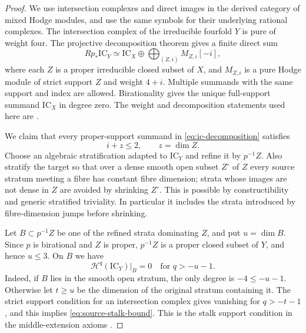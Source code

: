 \begin{proof}
We use intersection complexes and direct images in the derived
category of mixed Hodge modules, and use the same symbols for their
underlying rational complexes.  The intersection complex of the
irreducible fourfold $Y$ is pure of weight four.  The projective
decomposition theorem gives a finite direct sum
\begin{equation}\label{eq:ic-decomposition}
 Rp_*\mathrm{IC}_Y\simeq
 \mathrm{IC}_X\oplus\bigoplus_{(Z,i)}M_{Z,i}[-i],
\end{equation}
where each $Z$ is a proper irreducible closed subset of $X$, and
$M_{Z,i}$ is a pure Hodge module of strict support $Z$ and weight
$4+i$.  Multiple summands with the same support and index are
allowed.  Birationality gives the unique full-support summand
$\mathrm{IC}_X$ in degree zero.  The weight and decomposition
statements used here are \cite[\S\S1.6--1.8, 1.12--1.13]{Saito1989}.

We claim that every proper-support summand in
\eqref{eq:ic-decomposition} satisfies
\begin{equation}\label{eq:proper-support-bound}
 i+z\leq 2,\qquad z=\dim Z.
\end{equation}
Choose an algebraic stratification adapted to $\mathrm{IC}_Y$ and
refine it by $p^{-1}Z$.  Also stratify the target so that over a
dense smooth open subset $Z^\circ$ of $Z$ every source stratum
meeting a fibre has constant fibre dimension; strata whose images
are not dense in $Z$ are avoided by shrinking $Z^\circ$.
This is possible by constructibility and generic stratified
triviality.  In particular it includes the strata introduced by
fibre-dimension jumps before shrinking.

Let $B\subset p^{-1}Z$ be one of the refined strata dominating
$Z$, and put $u=\dim B$.  Since $p$ is birational and $Z$ is
proper, $p^{-1}Z$ is a proper closed subset of $Y$, and hence
$u\leq3$.  On $B$ we have
\begin{equation}\label{eq:source-stalk-bound}
 \mathcal H^q(\mathrm{IC}_Y)|_B=0\quad\text{for }q>-u-1.
\end{equation}
Indeed, if $B$ lies in the smooth open stratum, the only degree is
$-4\leq-u-1$.  Otherwise let $t\geq u$ be the dimension of the
original stratum containing it.  The strict support condition for
an intersection complex gives vanishing for $q>-t-1$, and this
implies \eqref{eq:source-stalk-bound}.  This is the stalk support
condition in the middle-extension axioms
\cite[\S2.3 and \S3.3, axiom {\rm[AX1]}(c)]{GM1983}.


\end{proof}
